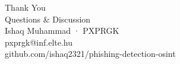 \documentclass[aspectratio=169,10pt]{beamer}
\begin{document}
\begin{frame}[standout]
  \Huge Thank You\\[0.3em]
  \Large Questions \& Discussion\\[0.8em]
  \normalsize
  Ishaq Muhammad · PXPRGK\\[0.2em]
  pxprgk@inf.elte.hu\\[0.4em]
  {\footnotesize github.com/ishaq2321/phishing-detection-osint}
\end{frame}
\end{document}
